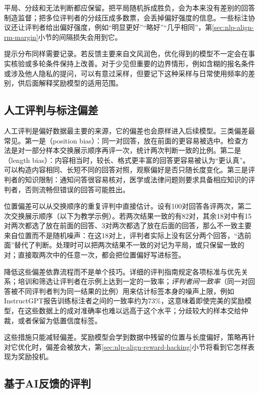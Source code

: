 平局、分歧和无法判断都应保留。把平局随机拆成胜负，会为本来没有差别的回答制造监督；把多位评判者的分歧压成多数票，会丢掉偏好强度的信息。一些标注协议还让评判者给出偏好强度，例如“明显更好”“略好”“几乎相同”，第\ref{sec:nlp-align-rm-margin}小节的间隔损失会用到它。

提示分布同样需要记录。若反馈主要来自文风润色，优化得到的模型不一定会在事实核验或多轮条件保持上改善。对于少见但重要的边界情形，例如含糊的报名条件或涉及他人隐私的提问，可以有意过采样，但要记下这种采样与日常使用频率的差别，供后面解释奖励模型的适用范围。

\subsection{人工评判与标注偏差}
\label{sec:nlp-align-judges}

人工评判是偏好数据最主要的来源，它的偏差也会原样进入后续模型。三类偏差最常见。第一是（position bias）：同一对回答，放在前面的更容易被选中。检查方法是对一部分样本交换展示顺序再评一次，统计两次判断一致的比例。第二是（length bias）：内容相当时，较长、格式更丰富的回答更容易被认为“更认真”。可以构造内容相同、长短不同的回答对照，观察偏好是否只随长度变化。第三是评判者的知识限制：通知问答很容易核对，医学或法律问题则要求具备相应知识的评判者，否则流畅但错误的回答可能胜出。

位置偏差可以从交换顺序的重复评判中直接估计。设有100对回答各评两次，第二次交换展示顺序（以下为教学示例）。若两次结果一致的有82对，其余18对中有15对两次都选了放在前面的回答、3对两次都选了放在后面的回答，那么不一致主要来自位置而不是随机噪声：在这18对上，评判者实际上没有区分两个回答，“选前面”替代了判断。处理时可以把两次结果不一致的对记为平局，或只保留一致的对；直接取两次中的任意一次，都会把位置偏好写进标签。

降低这些偏差依靠流程而不是单个技巧。详细的评判指南规定各项标准与优先关系；培训和筛选让评判者在示例上达到一定的一致率；\emph{评判者间一致率}（同一对回答被不同评判者判为同一结果的比例）用来估计标签本身的噪声上限，例如InstructGPT报告训练标注者之间的一致率约为73\%\cite{ouyang2022instructgpt}，这意味着即使完美的奖励模型，在这些数据上的成对准确率也难以远高于这个水平；分歧较大的样本交给仲裁，或者保留为低置信度标签。

这些措施只能减轻偏差。奖励模型会学到数据中残留的位置与长度偏好，策略再针对它优化时，偏差会被放大，第\ref{sec:nlp-align-reward-hacking}小节将看到它怎样表现为奖励投机。

\subsection{基于AI反馈的评判}
\label{sec:nlp-align-ai-feedback}

